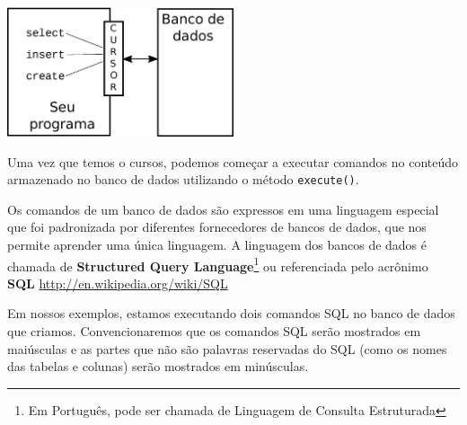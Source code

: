 \beforefig
\centerline{\includegraphics[height=1.50in]{figs2/cursor.eps}}
\afterfig


Uma vez que temos o cursos, podemos começar a executar comandos no conteúdo
armazenado no banco de dados utilizando o método {\tt execute()}.


Os comandos de um banco de dados são expressos em uma linguagem especial que
foi padronizada por diferentes fornecedores de bancos de dados, que nos
permite aprender uma única linguagem. A linguagem dos bancos de dados é
chamada de {\bf Structured Query Language}\footnote{Em Português, pode ser
  chamada de Linguagem de Consulta Estruturada} ou referenciada pelo acrônimo
{\bf SQL}
\url{http://en.wikipedia.org/wiki/SQL}


Em nossos exemplos, estamos executando dois comandos SQL no banco de dados que
criamos. Convencionaremos que os comandos SQL serão mostrados em maiúsculas e
as partes que não são palavras reservadas do SQL (como os nomes das tabelas e
colunas) serão mostrados em minúsculas.


